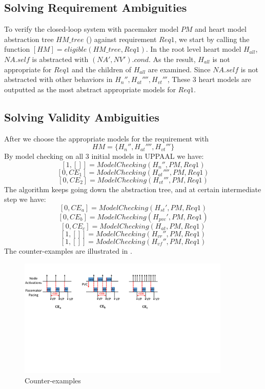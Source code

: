\subsection{Solving Requirement Ambiguities}
To verify the closed-loop system with pacemaker model $PM$ and heart model abstraction tree $HM\_tree$ () against requirement $Req1$, we start by calling the function $[HM]=eligible(HM\_tree,Req1)$. In the root level heart model $H_{all}$, $NA.self$ is abstracted with $(NA',NV').cond$. As the result, $H_{all}$ is not appropriate for $Req1$ and the children of $H_{all}$ are examined. Since $NA.self$ is not abstracted with other behaviors in $H_n'',H_{at}'''',H_{vt}'''$, These 3 heart models are outputted as the most abstract appropriate models for $Req1$.
\subsection{Solving Validity Ambiguities}
After we choose the appropriate models for the requirement with 
$$HM=\{H_n'',H_{at}'''',H_{vt}'''\}$$
By model checking on all 3 initial models in UPPAAL we have: 
$$[1,[]]=ModelChecking(H_n'',PM,Req1)$$
 $$[0,CE_1]=ModelChecking(H_{at}'''',PM,Req1)$$
$$[0,CE_2]=ModelChecking(H_{vt}''',PM,Req1)$$
The algorithm keeps going down the abstraction tree, and at certain intermediate step we have:
 $$[0,CE_a]=ModelChecking(H_{st}',PM,Req1)$$
  $$[0,CE_b]=ModelChecking(H_{pvc}',PM,Req1)$$
	$$[0,CE_c]=ModelChecking(H_{at},PM,Req1)$$
 $$[1,[]]=ModelChecking(H_{vr}'',PM,Req1)$$
 $$[1,[]]=ModelChecking(H_{vf}'',PM,Req1)$$
The counter-examples are illustrated in .
\begin{figure}[!t]
		\centering
		\includegraphics[width=0.9\textwidth]{figs/case.pdf}
		\caption{\small Counter-examples}
		\label{fig:CE}
\end{figure}
